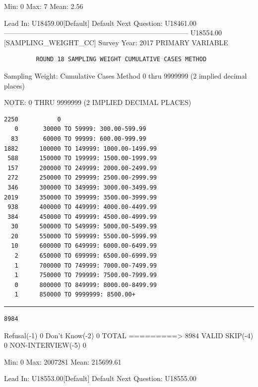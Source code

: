 \documentclass[
  man,floatsintext]{apa6}
\begin{document}
Min: 0 Max: 7 Mean: 2.56

Lead In: U18459.00{[}Default{]}
Default Next Question: U18461.00
--------------------------------------------------------------------------------
U18554.00 {[}SAMPLING\_WEIGHT\_CC{]} Survey Year: 2017
PRIMARY VARIABLE

\begin{verbatim}
         ROUND 18 SAMPLING WEIGHT CUMULATIVE CASES METHOD
\end{verbatim}

Sampling Weight: Cumulative Cases Method 0 thru 9999999 (2 implied decimal
places)

NOTE: 0 THRU 9999999 (2 IMPLIED DECIMAL PLACES)

\begin{verbatim}
2250           0
   0       30000 TO 59999: 300.00-599.99
  83       60000 TO 99999: 600.00-999.99
1882      100000 TO 149999: 1000.00-1499.99
 588      150000 TO 199999: 1500.00-1999.99
 157      200000 TO 249999: 2000.00-2499.99
 272      250000 TO 299999: 2500.00-2999.99
 346      300000 TO 349999: 3000.00-3499.99
2019      350000 TO 399999: 3500.00-3999.99
 938      400000 TO 449999: 4000.00-4499.99
 384      450000 TO 499999: 4500.00-4999.99
  30      500000 TO 549999: 5000.00-5499.99
  20      550000 TO 599999: 5500.00-5999.99
  10      600000 TO 649999: 6000.00-6499.99
   2      650000 TO 699999: 6500.00-6999.99
   1      700000 TO 749999: 7000.00-7499.99
   1      750000 TO 799999: 7500.00-7999.99
   0      800000 TO 849999: 8000.00-8499.99
   1      850000 TO 9999999: 8500.00+
\end{verbatim}

\begin{center}\rule{0.5\linewidth}{0.5pt}\end{center}

\begin{verbatim}
8984
\end{verbatim}

Refusal(-1) 0
Don't Know(-2) 0
TOTAL =========\textgreater{} 8984 VALID SKIP(-4) 0 NON-INTERVIEW(-5) 0

Min: 0 Max: 2007281 Mean: 215699.61

Lead In: U18553.00{[}Default{]}
Default Next Question: U18555.00
\end{document}
